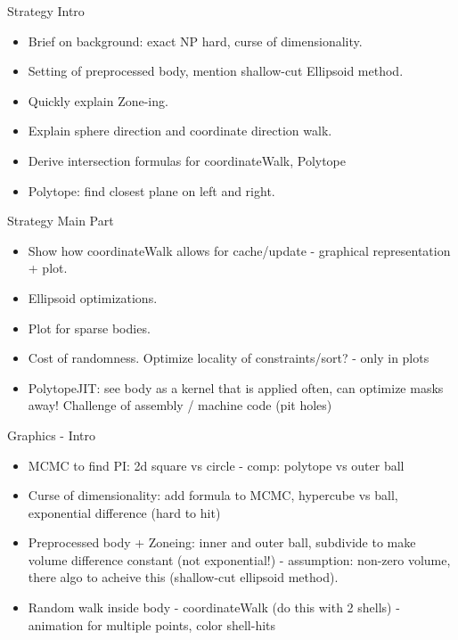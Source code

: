 \documentclass[table]{beamer}
\begin{document}
\begin{frame}{Strategy Intro}
	\begin{itemize}
		\item Brief on background: exact NP hard, curse of dimensionality.
		\item Setting of preprocessed body, mention shallow-cut Ellipsoid method.
		\item Quickly explain Zone-ing.
		\item Explain sphere direction and coordinate direction walk.
		\item Derive intersection formulas for coordinateWalk, Polytope
		\item Polytope: find closest plane on left and right.
	\end{itemize}
\end{frame}

\begin{frame}{Strategy Main Part}
	\begin{itemize}
		\item Show how coordinateWalk allows for cache/update - graphical representation + plot.
		\item Ellipsoid optimizations.
		\item Plot for sparse bodies.
		\item Cost of randomness. Optimize locality of constraints/sort? - only in plots
		\item PolytopeJIT: see body as a kernel that is applied often, can optimize masks away! Challenge of assembly / machine code (pit holes)
	\end{itemize}
\end{frame}

\begin{frame}{Graphics - Intro}
	\begin{itemize}
	    \item MCMC to find PI: 2d square vs circle - comp: polytope vs outer ball
	    \item Curse of dimensionality: add formula to MCMC, hypercube vs ball, exponential difference (hard to hit)
	    \item Preprocessed body + Zoneing: inner and outer ball, subdivide to make volume difference constant (not exponential!) - assumption: non-zero volume, there algo to acheive this (shallow-cut ellipsoid method).
	    \item Random walk inside body - coordinateWalk (do this with 2 shells) - animation for multiple points, color shell-hits
	\end{itemize}
\end{frame}
\end{document}
